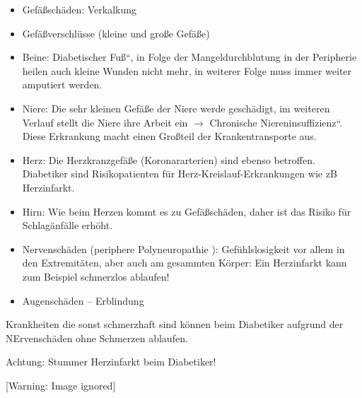 \documentclass{article}
\makeatletter
\newcommand\captionof[1]{\def\@captype{#1}\caption}
\makeatother
\begin{document}
\begin{itemize}
\item Gef\"a{\ss}sch\"aden: Verkalkung

\end{itemize}
\begin{itemize}
\item Gef\"a{\ss}verschl\"usse (kleine und gro{\ss}e Gef\"a{\ss}e)

\end{itemize}
\begin{itemize}
\item Beine: {\quotedblbase}Diabetischer Fu{\ss}{\textquotedblleft}, in
Folge der Mangeldurchblutung in der Peripherie heilen auch kleine
Wunden nicht mehr, in weiterer Folge muss immer weiter amputiert
werden.

\item Niere: Die sehr kleinen Gef\"a{\ss}e der Niere werde gesch\"adigt,
im weiteren Verlauf stellt die Niere ihre Arbeit ein ${\rightarrow}$
{\quotedblbase}Chronische Niereninsuffizienz{\textquotedblleft}. Diese
Erkrankung macht einen Gro{\ss}teil der Krankentransporte aus.

\item Herz: Die Herzkranzgef\"a{\ss}e (Koronar\-arterien) sind ebenso
betroffen. Diabetiker sind Risikopatienten f\"ur
Herz-Kreislauf-Erkrankungen wie zB Herz\-infarkt.

\item Hirn: Wie beim Herzen kommt es zu Gef\"a{\ss}sch\"aden, daher ist
das Risiko f\"ur Schlag\"anf\"alle erh\"oht.

\end{itemize}
\begin{itemize}
\item Nervensch\"aden (periphere Polyneuropathie ): Gef\"uhlslosigkeit
vor allem in den Extremit\"aten, aber auch am gesammten K\"orper: Ein
Herzinfarkt kann zum Beispiel schmerzlos ablaufen!

\item Augensch\"aden -- Erblindung

\end{itemize}
Krankheiten die sonst schmerzhaft sind k\"onnen beim Diabetiker aufgrund
der NErvensch\"aden ohne Schmerzen ablaufen. 

Achtung: Stummer Herzinfarkt beim Diabetiker!

 [Warning: Image ignored] %
\captionof{figure}[Die h\"aufigsten Folgeerkrankungen des Diebetikers:
Nervensch\"adigungen, Herzinfarkt, Nierensch\"aden, Schlaganfall]{Die
h\"aufigsten Folgeerkrankungen des Diebetikers: Nervensch\"adigungen,
Herzinfarkt, Nierensch\"aden, Schlaganfall}
\end{document}
